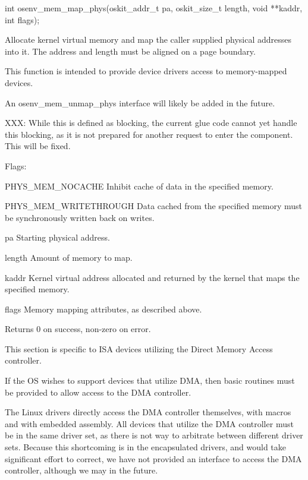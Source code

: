 \begin{apisyn}
	\funcproto int osenv_mem_map_phys(oskit_addr_t pa, oskit_size_t length,
						void **kaddr, int flags);
\end{apisyn}
\drvtoosb
\begin{apidesc}
	Allocate kernel virtual memory and map the caller
	supplied physical addresses into it.  The address
	and length must be aligned on a page boundary.

	This function is intended to provide device drivers
	access to memory-mapped devices.

	An osenv_mem_unmap_phys interface will likely be added in the future.

	XXX: While this is defined as blocking, the current glue
	code cannot yet handle this blocking, as it is not
	prepared for another request to enter the component.
	This will be fixed.

	Flags:
	\begin{icsymlist}
	\item[PHYS_MEM_NOCACHE]
		Inhibit cache of data in the specified memory.
	\item[PHYS_MEM_WRITETHROUGH]
		Data cached from the specified memory must
		be synchronously written back on writes.
	\end{icsymlist}
\end{apidesc}
\begin{apiparm}
	\item[pa]
		Starting physical address.
	\item[length]
		Amount of memory to map.
	\item[kaddr]
		Kernel virtual address allocated and
		returned by the kernel that maps the
		specified memory.
	\item[flags]
		Memory mapping attributes, as described above.
\end{apiparm}
\begin{apiret}
	Returns 0 on success, non-zero on error.
\end{apiret}




This section is specific to ISA devices utilizing the
Direct Memory Access controller.

If the OS wishes to support devices that utilize DMA,
then basic routines must be provided to allow access
to the DMA controller.

The Linux drivers directly access the DMA controller
themselves, with macros and with embedded assembly.
All devices that utilize the DMA controller must be in the same
driver set, as there is not way to arbitrate between
different driver sets.
Because this shortcoming is in the encapsulated drivers,
and would take significant effort to correct,
we have not provided an interface to access the DMA controller,
although we may in the future.

